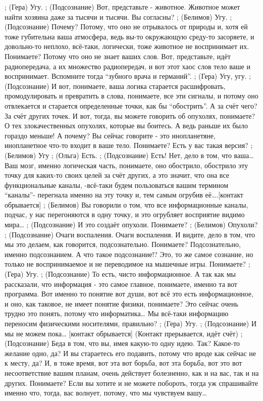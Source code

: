 ;	(Гера)  Угу.
;	(Подсознание) Вот, представьте - животное. Животное может найти хозяина даже  за тысячи и тысячи. Вы согласны? 
;	(Белимов) Угу.
;	(Подсознание) Почему? Потому, что оно не отрывалось от природы и, хотя ей тоже губительна ваша атмосфера, ведь вы-то окружающую среду-то засоряете, и довольно-то неплохо, всё-таки, логически, тоже животное не воспринимает их. Понимаете? Потому что оно не знает ваших слов. Вот, представьте, идёт радиопередача, а их множество радиопередач, и вот этот хаос слов тело ваше и воспринимает. Вспомните тогда ``зубного врача и германий''. 
;	(Гера) Угу, угу.
;	(Подсознание) И вот, понимаете, ваша логика старается расшифровать, промодулировать и превратить в слова, понимаете, все эти сигналы, и потому оно отвлекается и старается определенные точки, как бы ``обострить''. А за счёт чего? За счёт других точек. И вот, тогда, вы можете говорить об опухолях, понимаете? О тех злокачественных опухолях, которые вы боитесь. А ведь раньше их было гораздо меньше! А почему? Вы сейчас говорите - это инопланетяне, инопланетное что-то входит в ваше тело. Понимаете? Есть у вас такая версия?
;	(Белимов) Угу
;	(Ольга) Есть.
;	(Подсознание) Есть! Нет, дело в том, что ваша…Ваш мозг, именно логическая часть, понимаете, оно обострило, обострило эту точку для каких-то своих целей за счёт других, а это значит, что она все функциональные каналы, -всё-таки будем пользоваться вашим термином ``каналы”- перегнала именно на эту точку и, тем самым огрубив её….[контакт обрывается]
;	(Белимов) Вы говорили о том, что все информационные каналы, подчас, у нас перегоняются в одну точку, и это огрубляет восприятие видимо мира…
;	(Подсознание) И это создаёт опухоли. Понимаете?
;	(Белимов) Опухоли?
;	(Подсознание) Очаги воспаления. Очаги воспаления. И видите, дело в том, что мы это делаем, как говорится, подсознательно. Понимаете? Подсознательно, именно подсознанием. А что такое подсознание!? Это, то же самое сознание, но только не воспринимаемое и не переводимое на мышечные игры. Понимаете?
;	(Гера) Угу.
;	(Подсознание) То есть, чисто информационное. А так как мы рассказали, что информация - это самое главное, понимаете, именно та вот программа. Вот именно то понятие вот  души, вот всё это есть информационное, и оно, как таковое, не имеет понятие физики, понимаете? Это сейчас очень трудно это понять,  потому что информатика… Мы всё-таки информацию переносим физическими носителями,  правильно?
;	(Гера) Угу.
;	(Подсознание) И мы не можем пока… [контакт обрывается]
(Контакт прерывается, идёт счёт)
;	(Подсознание) Беда в том, что вы, имея какую-то одну идею. Так? Какое-то желание одно, да? И вы стараетесь его подавить, потому что вроде как сейчас не к месту, да? И, в тоже время, вот эта вот борьба, вот эта борьба, вот это вот несоответствие вашим планам, очень действует болезненно, как и на вас, так и на других. Понимаете? Если вы хотите и не можете побороть, тогда уж спрашивайте именно что, тогда, вас волнует, потому, что мы чувствуем вашу…
